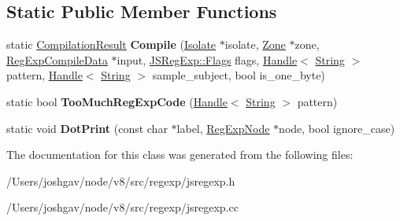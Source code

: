 \subsection*{Static Public Member Functions}
\begin{DoxyCompactItemize}
\item 
static \hyperlink{structv8_1_1internal_1_1_reg_exp_engine_1_1_compilation_result}{Compilation\+Result} {\bfseries Compile} (\hyperlink{classv8_1_1internal_1_1_isolate}{Isolate} $\ast$isolate, \hyperlink{classv8_1_1internal_1_1_zone}{Zone} $\ast$zone, \hyperlink{structv8_1_1internal_1_1_reg_exp_compile_data}{Reg\+Exp\+Compile\+Data} $\ast$input, \hyperlink{classv8_1_1base_1_1_flags}{J\+S\+Reg\+Exp\+::\+Flags} flags, \hyperlink{classv8_1_1internal_1_1_handle}{Handle}$<$ \hyperlink{classv8_1_1internal_1_1_string}{String} $>$ pattern, \hyperlink{classv8_1_1internal_1_1_handle}{Handle}$<$ \hyperlink{classv8_1_1internal_1_1_string}{String} $>$ sample\+\_\+subject, bool is\+\_\+one\+\_\+byte)\hypertarget{classv8_1_1internal_1_1_reg_exp_engine_a9c28fafe897960e4414af1f5f8e69036}{}\label{classv8_1_1internal_1_1_reg_exp_engine_a9c28fafe897960e4414af1f5f8e69036}

\item 
static bool {\bfseries Too\+Much\+Reg\+Exp\+Code} (\hyperlink{classv8_1_1internal_1_1_handle}{Handle}$<$ \hyperlink{classv8_1_1internal_1_1_string}{String} $>$ pattern)\hypertarget{classv8_1_1internal_1_1_reg_exp_engine_a1ceee4f78b6aa76ab2257ec80f285ccd}{}\label{classv8_1_1internal_1_1_reg_exp_engine_a1ceee4f78b6aa76ab2257ec80f285ccd}

\item 
static void {\bfseries Dot\+Print} (const char $\ast$label, \hyperlink{classv8_1_1internal_1_1_reg_exp_node}{Reg\+Exp\+Node} $\ast$node, bool ignore\+\_\+case)\hypertarget{classv8_1_1internal_1_1_reg_exp_engine_abcda5d365182e49c9cd24569efb13d7b}{}\label{classv8_1_1internal_1_1_reg_exp_engine_abcda5d365182e49c9cd24569efb13d7b}

\end{DoxyCompactItemize}


The documentation for this class was generated from the following files\+:\begin{DoxyCompactItemize}
\item 
/\+Users/joshgav/node/v8/src/regexp/jsregexp.\+h\item 
/\+Users/joshgav/node/v8/src/regexp/jsregexp.\+cc\end{DoxyCompactItemize}
